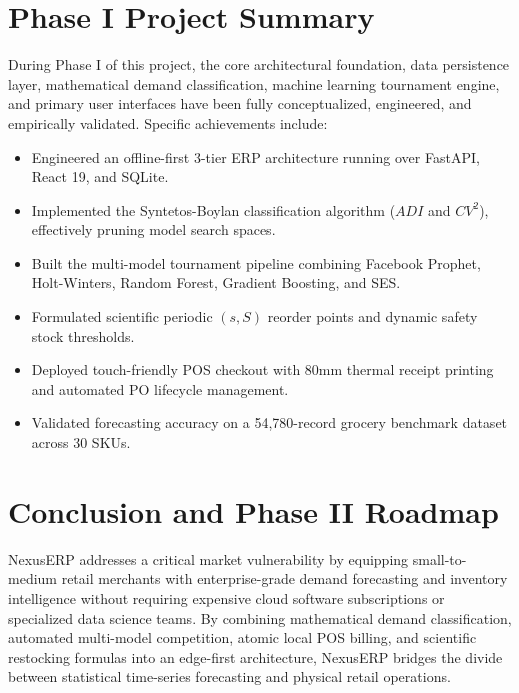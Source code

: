 \section{Phase I Project Summary}
During Phase I of this project, the core architectural foundation, data persistence layer, mathematical demand classification, machine learning tournament engine, and primary user interfaces have been fully conceptualized, engineered, and empirically validated. Specific achievements include:
\begin{itemize}
    \item Engineered an offline-first 3-tier ERP architecture running over FastAPI, React 19, and SQLite.
    \item Implemented the Syntetos-Boylan classification algorithm ($ADI$ and $CV^2$), effectively pruning model search spaces.
    \item Built the multi-model tournament pipeline combining Facebook Prophet, Holt-Winters, Random Forest, Gradient Boosting, and SES.
    \item Formulated scientific periodic $(s, S)$ reorder points and dynamic safety stock thresholds.
    \item Deployed touch-friendly POS checkout with 80mm thermal receipt printing and automated PO lifecycle management.
    \item Validated forecasting accuracy on a 54,780-record grocery benchmark dataset across 30 SKUs.
\end{itemize}

\section{Conclusion and Phase II Roadmap}
NexusERP addresses a critical market vulnerability by equipping small-to-medium retail merchants with enterprise-grade demand forecasting and inventory intelligence without requiring expensive cloud software subscriptions or specialized data science teams. By combining mathematical demand classification, automated multi-model competition, atomic local POS billing, and scientific restocking formulas into an edge-first architecture, NexusERP bridges the divide between statistical time-series forecasting and physical retail operations.

